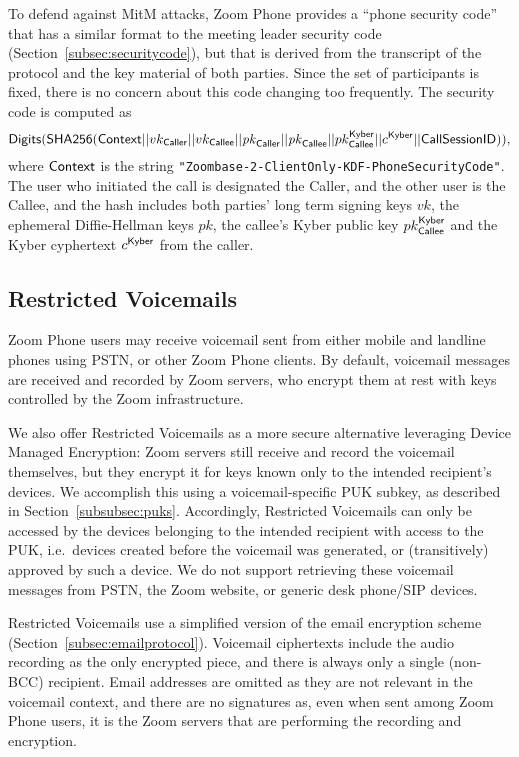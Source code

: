To defend against MitM attacks, Zoom Phone provides a ``phone security code'' that has a similar
format to the meeting leader security code (Section~\ref{subsec:securitycode}), but that is derived
from the transcript of the protocol and the key material of both parties. Since the set of participants is fixed, there is no
concern about this code changing too frequently. The security code is computed as
$$\mathsf{Digits}({\sf SHA256}({\sf Context} || vk_{\sf Caller} || vk_{\sf Callee} || \mathit{pk}_{\sf Caller} || \mathit{pk}_{\sf Callee} || pk^{\sf Kyber}_{\sf Callee} || c^{\sf Kyber} || {\sf
CallSessionID})),$$ %
where ${\sf Context}$ is the string \texttt{"Zoombase-2-ClientOnly-KDF-PhoneSecurityCode"}. The user who
initiated the call is designated the {\sf Caller}, and the other user is the {\sf Callee}, and the hash includes both parties' long term signing keys $vk$, the ephemeral Diffie-Hellman keys $pk$, the callee's Kyber public key $pk^{\sf Kyber}_{\sf Callee}$ and the Kyber cyphertext $c^{\sf Kyber}$ from the caller.

\subsection{Restricted Voicemails}\label{subsec:voicemail} Zoom Phone users may receive
voicemail sent from either mobile and landline phones using PSTN, or other Zoom Phone clients. By
default, voicemail messages are received and recorded by Zoom servers, who encrypt them at rest with
keys controlled by the Zoom infrastructure. 

We also offer Restricted Voicemails as a more secure alternative leveraging Device Managed
Encryption: Zoom servers still receive and record the voicemail themselves, but they encrypt it for
keys known only to the intended recipient's devices. We accomplish this using a voicemail-specific
PUK subkey, as described in Section~\ref{subsubsec:puks}. Accordingly, Restricted Voicemails can
only be accessed by the devices belonging to the intended recipient with access to the PUK, i.e.\
devices created before the voicemail was generated, or (transitively) approved by such a device. We
do not support retrieving these voicemail messages from PSTN, the Zoom website, or generic desk
phone/SIP devices. 

Restricted Voicemails use a simplified version of the email encryption scheme
(Section~\ref{subsec:emailprotocol}). Voicemail ciphertexts include the audio recording as the only
encrypted piece, and there is always only a single (non-BCC) recipient. Email addresses are omitted
as they are not relevant in the voicemail context, and there are no signatures as, even when sent
among Zoom Phone users, it is the Zoom servers that are performing the recording and encryption.

